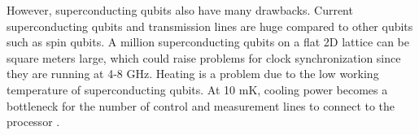 However, superconducting qubits also have many drawbacks. Current superconducting qubits and transmission lines are huge compared to other qubits such as spin qubits. A million superconducting qubits on a flat 2D lattice can be square meters large, which could raise problems for clock synchronization since they are running at 4-8 GHz. Heating is a problem due to the low working temperature of superconducting qubits. At 10 mK, cooling power becomes a bottleneck for the number of control and measurement lines to connect to the processor \cite{krantz_quantum_2019}.

